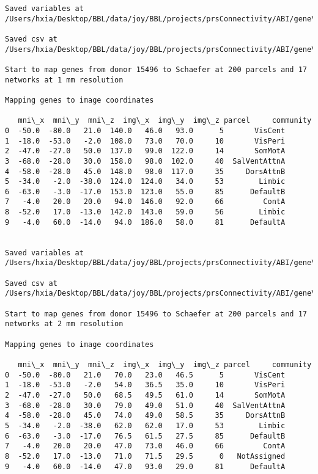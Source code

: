 \documentclass[11pt]{article}
\begin{document}
\begin{Verbatim}[commandchars=\\\{\}]
Saved variables at /Users/hxia/Desktop/BBL/data/joy/BBL/projects/prsConnectivity/ABI/gene\_mapping/15496donor\_200Parcels\_7Network\_2mm.pkl

Saved csv at /Users/hxia/Desktop/BBL/data/joy/BBL/projects/prsConnectivity/ABI/gene\_mapping/15496donor\_200Parcels\_7Network\_2mm.csv

Start to map genes from donor 15496 to Schaefer at 200 parcels and 17 networks at 1 mm resolution

Mapping genes to image coordinates

   mni\_x  mni\_y  mni\_z  img\_x  img\_y  img\_z parcel     community
0  -50.0  -80.0   21.0  140.0   46.0   93.0      5       VisCent
1  -18.0  -53.0   -2.0  108.0   73.0   70.0     10       VisPeri
2  -47.0  -27.0   50.0  137.0   99.0  122.0     14       SomMotA
3  -68.0  -28.0   30.0  158.0   98.0  102.0     40  SalVentAttnA
4  -58.0  -28.0   45.0  148.0   98.0  117.0     35     DorsAttnB
5  -34.0   -2.0  -38.0  124.0  124.0   34.0     53        Limbic
6  -63.0   -3.0  -17.0  153.0  123.0   55.0     85      DefaultB
7   -4.0   20.0   20.0   94.0  146.0   92.0     66         ContA
8  -52.0   17.0  -13.0  142.0  143.0   59.0     56        Limbic
9   -4.0   60.0  -14.0   94.0  186.0   58.0     81      DefaultA


Saved variables at /Users/hxia/Desktop/BBL/data/joy/BBL/projects/prsConnectivity/ABI/gene\_mapping/15496donor\_200Parcels\_17Network\_1mm.pkl

Saved csv at /Users/hxia/Desktop/BBL/data/joy/BBL/projects/prsConnectivity/ABI/gene\_mapping/15496donor\_200Parcels\_17Network\_1mm.csv

Start to map genes from donor 15496 to Schaefer at 200 parcels and 17 networks at 2 mm resolution

Mapping genes to image coordinates

   mni\_x  mni\_y  mni\_z  img\_x  img\_y  img\_z parcel     community
0  -50.0  -80.0   21.0   70.0   23.0   46.5      5       VisCent
1  -18.0  -53.0   -2.0   54.0   36.5   35.0     10       VisPeri
2  -47.0  -27.0   50.0   68.5   49.5   61.0     14       SomMotA
3  -68.0  -28.0   30.0   79.0   49.0   51.0     40  SalVentAttnA
4  -58.0  -28.0   45.0   74.0   49.0   58.5     35     DorsAttnB
5  -34.0   -2.0  -38.0   62.0   62.0   17.0     53        Limbic
6  -63.0   -3.0  -17.0   76.5   61.5   27.5     85      DefaultB
7   -4.0   20.0   20.0   47.0   73.0   46.0     66         ContA
8  -52.0   17.0  -13.0   71.0   71.5   29.5      0   NotAssigned
9   -4.0   60.0  -14.0   47.0   93.0   29.0     81      DefaultA



\end{Verbatim}
\end{document}
